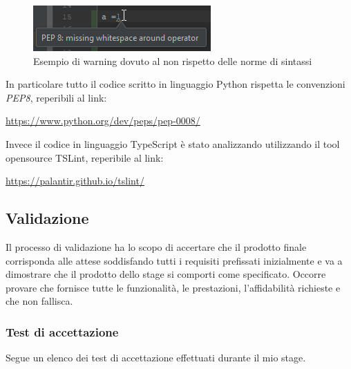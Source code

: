	\begin{figure}[H]
		\centering
		\includegraphics[width=0.5\linewidth]{immagini/pyc-warning}
		\caption{Esempio di warning dovuto al non rispetto delle norme di sintassi}
		\label{fig:pycarm-warning}
	\end{figure}
	
	In particolare tutto il codice scritto in linguaggio Python rispetta le convenzioni \textit{PEP8}, reperibili al link:
	\begin{center}
		\url{https://www.python.org/dev/peps/pep-0008/}
	\end{center}

	Invece il codice in linguaggio TypeScript è stato analizzando utilizzando il tool opensource TSLint, reperibile al link:
	\begin{center}
		\url{https://palantir.github.io/tslint/}
	\end{center}
	
	\subsection{Validazione}
Il processo di validazione ha lo scopo di accertare che il prodotto finale corrisponda alle attese soddisfando tutti i requisiti prefissati inizialmente e va a dimostrare che il prodotto dello stage si comporti come specificato. Occorre provare che fornisce tutte le funzionalità, le prestazioni, l’affidabilità richieste e che non fallisca. \\

\subsubsection{Test di accettazione}
Segue un elenco dei test di accettazione effettuati durante il mio stage.

